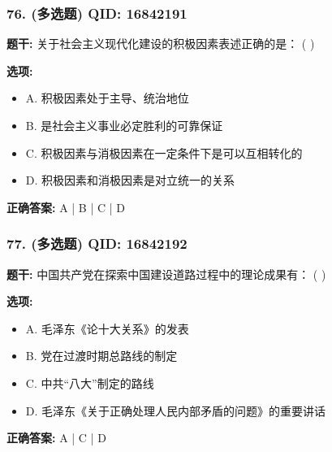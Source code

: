 \documentclass[12pt,UTF8]{ctexart}
\begin{document}
\subsubsection*{76. (多选题) \small QID: 16842191}

\textbf{题干:}
关于社会主义现代化建设的积极因素表述正确的是： ( )

\textbf{选项:}
\begin{itemize}[leftmargin=*]

  \item A. 积极因素处于主导、统治地位

  \item B. 是社会主义事业必定胜利的可靠保证

  \item C. 积极因素与消极因素在一定条件下是可以互相转化的

  \item D. 积极因素和消极因素是对立统一的关系

\end{itemize}

\textbf{正确答案:}
A | B | C | D

\vspace{0.3em}\hrulefill\vspace{0.7em}

\subsubsection*{77. (多选题) \small QID: 16842192}

\textbf{题干:}
中国共产党在探索中国建设道路过程中的理论成果有： ( )

\textbf{选项:}
\begin{itemize}[leftmargin=*]

  \item A. 毛泽东《论十大关系》的发表

  \item B. 党在过渡时期总路线的制定

  \item C. 中共“八大”制定的路线

  \item D. 毛泽东《关于正确处理人民内部矛盾的问题》的重要讲话

\end{itemize}

\textbf{正确答案:}
A | C | D

\vspace{0.3em}\hrulefill\vspace{0.7em}
\end{document}
